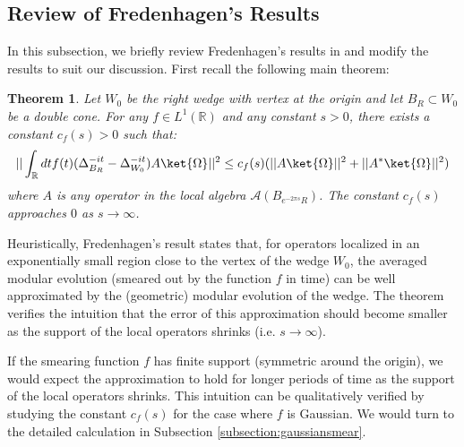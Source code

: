 \documentclass[a4paper,11pt]{article}
\newtheorem{theorem}{Theorem}
\theoremstyle{definition}
\theoremstyle{remark}
\begin{document}
\subsection{Review of Fredenhagen's Results}
In this subsection, we briefly review Fredenhagen's results in \cite{fredenhagen} and modify the results to suit our discussion. First recall the following main theorem:
\begin{theorem}
    Let $W_0$ be the right wedge with vertex at the origin and let $B_R\subset W_0$ be a double cone. For any $f\in L^1(\mathbb{R})$ and any constant $s > 0$, there exists a constant $c_f(s) > 0$ such that:
    \begin{equation}
        ||\int_\mathbb{R} dt f(t)(\Delta_{B_R}^{-it} - \Delta_{W_0}^{-it})A\ket{\Omega}||^2 \leq c_f(s)(||A\ket{\Omega}||^2 + ||A^*\ket{\Omega}||^2)
    \end{equation}
    where $A$ is any operator in the local algebra $\mathcal{A}(B_{e^{-2\pi s}R})$. The constant $c_f(s)$ approaches $0$ as $s\rightarrow \infty$.
\end{theorem}
Heuristically, Fredenhagen's result states that, for operators localized in an exponentially small region close to the vertex of the wedge $W_0$, the averaged modular evolution (smeared out by the function $f$ in time) can be well approximated by the (geometric) modular evolution of the wedge. The theorem verifies the intuition that the error of this approximation should become smaller as the support of the local operators shrinks (i.e. $s\rightarrow\infty$).

If the smearing function $f$ has finite support (symmetric around the origin), we would expect the approximation to hold for longer periods of time as the support of the local operators shrinks. This intuition can be qualitatively verified by studying the constant $c_f(s)$ for the case where $f$ is Gaussian. We would turn to the detailed calculation in Subsection \ref{subsection:gaussiansmear}.
\end{document}
